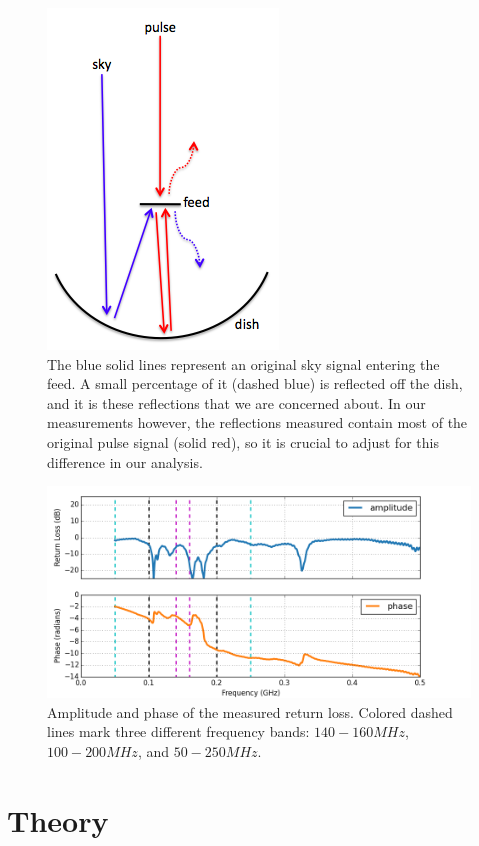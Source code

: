 \documentclass[12pt,preprint]{aastex}
\begin{document}
\begin{figure}
\centering
\includegraphics[totalheight=0.3\textheight]{plots/reflection_cartoon.png}
\caption{The blue solid lines represent an original sky signal entering the
feed. A small percentage of it (dashed blue) is reflected off the dish, and it
is these reflections that we are concerned about. In our measurements however,
the reflections measured contain most of the original pulse signal (solid red),
so it is crucial to adjust for this difference in our analysis.}
\label{fig:cartoon}
\end{figure}

\begin{figure}
\centering
\includegraphics[totalheight=0.4\textheight]{plots/frequency_amp_phase_fullbw.png}
\caption{Amplitude and phase of the measured return loss. Colored dashed lines
mark three different frequency bands: $140-160MHz$, $100-200MHz$, and
$50-250MHz$.}
\label{fig:freq}
\end{figure}

\section{Theory}{\label{sec:theory}}
\end{document}
